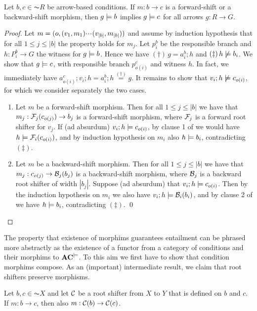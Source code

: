 \begin{proposition}
Let $b,c \in \AC{R}$  be arrow-based conditions. If $m:b\to c$ is a forward-shift or a backward-shift morphism, then $g\models b$ implies $g \models c$ for all arrows $g:R\to G$. 
\end{proposition}

\begin{proof}
Let $m = (o,(v_1,m_1){\cdotp\mkern-2mu\cdotp\mkern-2mu\cdotp\mkern1mu} (v_{|b|},m_{|b|}))$ and assume by induction hypothesis that for all $1\leq j\leq |b|$ the property holds for $m_j$. Let $p^b_i$ be the responsible branch and $h: P^b_i \to G$ the witness for $g\models b$. 
Hence we have $(\dagger)\, g=a^b_i;h$ and $(\ddagger)\, h \not\models b_i$.  
We show that $g \models c$, with responsible branch $p^c_{o(i)}$ and witness $h$. In fact, we immediately have  $a^c_{o(i)}; v_i ;h = a^b_i ; h \stackrel{(\dagger)}{=} g$. It remains to show that $v_i ;h \not\models c_{o(i)}$, for which we consider separately the two cases.
\begin{enumerate}
\item Let $m$ be a forward-shift morphism. Then for all $1\leq j\leq |b|$ we have that   $m_j:\mathcal{F}_j(c_{o(j)}) \rightarrow b_j$ is a forward-shift morphism, where $\mathcal{F}_j$ is a forward root shifter for $v_j$. If (ad absurdum) $v_i ;h \models c_{o(i)}$, by clause 1 of  we would have $h \models \mathcal{F}_i(c_{o(i)})$, and by induction hypothesis on $m_i$ also $h \models b_i$, contradicting $(\ddagger)$.

\item Let $m$ be a backward-shift morphism. Then for all $1\leq j\leq |b|$ we have that  $m_j:c_{o(j)}\rightarrow \mathcal{B}_j(b_j)$ is a backward-shift morphism, where $\mathcal{B}_j$ is a backward root shifter of width $|b_j|$.
Suppose (ad absurdum) that $v_i ;h \models c_{o(i)}$. Then by the induction hypothesis on $m_i$ we also have $v_i ;h \models \mathcal{B}_i(b_i)$, and by clause 2 of  we  have $h \models b_i$, contradicting $(\ddagger)$.
\qed
\end{enumerate}
\end{proof}
%
The property that existence of morphims guarantees entailment can be phrased more abstractly as the existence of a functor from a category of conditions and their morphims to $\mathbf{AC}^{\models}$. To this aim we first have to show that condition morphims compose. As an (important) intermediate result, we claim that root shifters preserve morphisms.

\begin{lemma}
Let $b,c \in  \AC{X}$ and let $\mathcal{C}$ be a root shifter from $X$ to $Y$ that is defined on $b$ and $c$. If $m:b\to c$, then also $m:\mathcal{C}(b)\rightarrow\mathcal{C}(c)$. 
\end{lemma}

